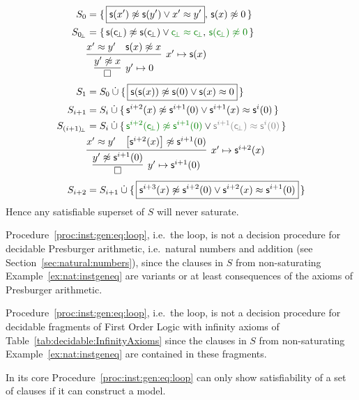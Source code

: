 \begin{example}
\begin{align*}
S_0 &= \{ \, \boxed{\msucc(x') \mNE \msucc (y') \lor x' \mEQ y'}, \, \msucc(x)\mNE 0 \, \}
\\
S_{0\!_\bot} &= \{ \, \msucc(\consbot) \mNE \msucc (\consbot) \lor{\colHi\consbot \mEQ \consbot}, \, {\colHi \msucc(\consbot)\mNE 0} \, \}
\\
&\infer[x'\mapsto \msucc(x)
]{
	\infer[y'\mapsto 0]{\emptyclause}{ y'\mNE x }
}
{x' \mEQ y' & \msucc(x)\mNE x}
\\
S_1 &= S_0\disjointunion \{ \,
\boxed{\msucc(\msucc(x)) \mNE \msucc(0) \lor \msucc(x) \mEQ 0} \,
\}
\\
S_{i+1} &= S_i\disjointunion \{ \,
\msucc^{i+2}(x) \mNE \msucc^{i+1} (0) \lor \msucc^{i+1}(x) \mEQ \msucc^i(0) \,
\}
\\
S_{(i+1)\!_\bot} &= S_i\disjointunion \{ \,
{\colHi \msucc^{i+2}(\consbot) \mNE \msucc^{i+1} (0)} \lor {\colG\msucc^{i+1}(\consbot) \mEQ \msucc^i(0)} \,
\}
\\
&\infer[x'\mapsto \msucc^{i+2}(x)
]{
	\infer[y'\mapsto \msucc^{i+1}(0)]{\emptyclause}{ y'\mNE \msucc^{i+1}(0) }
}
{x' \mEQ y' & \left[\msucc^{i+2}(x)\right]\mNE \msucc^{i+1}(0)}
\\
S_{i+2} &= S_{i+1}\disjointunion \{ \,
\boxed{\msucc^{i+3}(x) \mNE \msucc^{i+2}(0) \lor \msucc^{i+2}(x) \mEQ \msucc^{i+1}(0)} \,
\}
\end{align*}
Hence any satisfiable superset of \( S \) will never saturate.
\end{example}

\begin{corollary}
	Procedure~\ref{proc:inst:gen:eq:loop}, i.e.~the \InstGenEQ loop, 
	is not a decision procedure for decidable Presburger arithmetic,
	i.e.~natural numbers and addition (see Section~\vref{sec:natural:numbers}),
	since the clauses in \( S \) from non-saturating Example~\vref{ex:nat:instgeneq} 
	are variants or at least consequences of the axioms of Presburger arithmetic.
\end{corollary}

\begin{corollary}
	Procedure~\ref{proc:inst:gen:eq:loop}, i.e.~the \InstGenEQ loop, is not a decision procedure for decidable fragments of First Order Logic with infinity axioms of Table~\vref{tab:decidable:InfinityAxioms}
	since the clauses in \( S \) from non-saturating Example~\vref{ex:nat:instgeneq}
	are contained in these fragments.
\end{corollary}

In its core Procedure~\ref{proc:inst:gen:eq:loop} can only show satisfiability of a set of clauses if it can construct a model.



